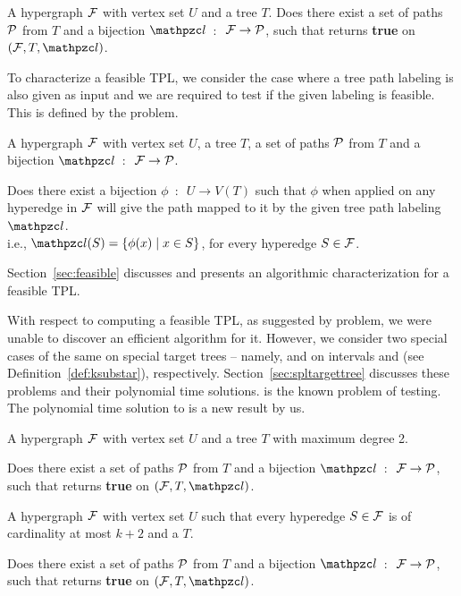 \begin{problemdef}{\CFTPL}{A hypergraph ${\cal F}$ with vertex set $U$ and
    a tree $T$.}
  Does there exist a set of paths ${\cal P}$ from $T$ and a bijection
  $\cl$~$:$~${\cal F} \rightarrow {\cal P}$, such that {\FTPL} returns {\bf
    true} on $(\cF, T, \cl)$.
\end{problemdef}

To characterize a feasible TPL, we consider the case where a tree path
labeling is also given as input and we are required to test if the
given labeling is feasible. This is defined by the \FTPL problem.

\begin{problemdef}{\FTPL}{A hypergraph ${\cal F}$ with vertex set $U$, a
    tree $T$, a set of paths ${\cal P}$ from $T$ and a bijection
    $\cl$~$:$~${\cal F} \rightarrow {\cal P}$.}

  Does there exist a bijection $\phi$~$:$~$U \rightarrow V(T)$ such
  that $\phi$ when applied on any hyperedge in ${\cal F}$ will give
  the path mapped to it by the given tree path labeling $\cl$.\\
  { i.e., $\cl(S) = \{\phi(x) \mid x \in S\}$, for every hyperedge $S
    \in {\cal F}$.}
\end{problemdef}

Section~\ref{sec:feasible} discusses \FTPL and presents an algorithmic
characterization for a feasible TPL.

With respect to computing a feasible TPL, as suggested by \CFTPL
problem, we were unable to discover an efficient algorithm for
it. However, we consider two special cases of the same on special
target trees -- namely, \CFTPLINT and \CFTPLKTREE on intervals and
\kstars (see Definition~\ref{def:ksubstar}), respectively.  Section~\ref{sec:spltargettree} discusses
these problems and their polynomial time solutions.  \CFTPLINT is the
known problem of \COP testing. The polynomial time solution to
\CFTPLKTREE is a new result by us.

\begin{problemdef}{\CFTPLINT}{ A hypergraph ${\cal F}$ with vertex set $U$
    and a tree $T$ with maximum degree 2.}

  Does there exist a set of paths ${\cal P}$ from $T$ and a bijection
  $\cl$~$:$~${\cal F} \rightarrow {\cal P}$, such that {\FTPL} returns {\bf
    true} on $(\cF, T, \cl)$.  
\end{problemdef}

\begin{problemdef}{\CFTPLKTREE}{A hypergraph ${\cal F}$ with vertex set $U$
    such that every hyperedge $S \in {\cal F}$ is of cardinality at most
    $k+2$ and a {\kstar} $T$.}

  Does there exist a set of paths ${\cal P}$ from $T$ and a bijection
  $\cl$~$:$~${\cal F} \rightarrow {\cal P}$, such that {\FTPL} returns {\bf
    true} on $(\cF, T, \cl)$.
\end{problemdef}

